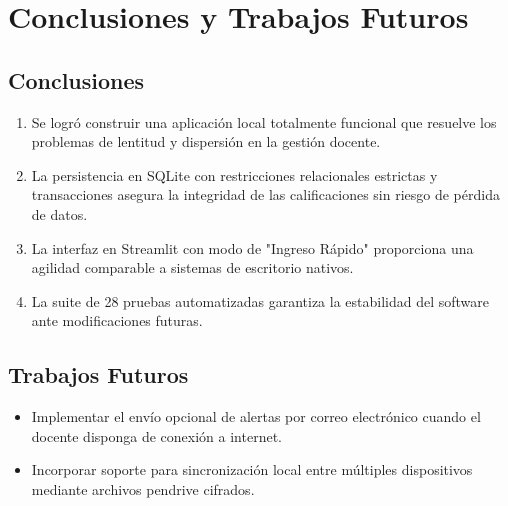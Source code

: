 \documentclass[12pt,a4paper]{article}
\begin{document}
\section{Conclusiones y Trabajos Futuros}

\subsection{Conclusiones}
\begin{enumerate}
    \item Se logró construir una aplicación local totalmente funcional que resuelve los problemas de lentitud y dispersión en la gestión docente.
    \item La persistencia en SQLite con restricciones relacionales estrictas y transacciones asegura la integridad de las calificaciones sin riesgo de pérdida de datos.
    \item La interfaz en Streamlit con modo de "Ingreso Rápido" proporciona una agilidad comparable a sistemas de escritorio nativos.
    \item La suite de 28 pruebas automatizadas garantiza la estabilidad del software ante modificaciones futuras.
\end{enumerate}

\subsection{Trabajos Futuros}
\begin{itemize}
    \item Implementar el envío opcional de alertas por correo electrónico cuando el docente disponga de conexión a internet.
    \item Incorporar soporte para sincronización local entre múltiples dispositivos mediante archivos pendrive cifrados.
\end{itemize}

\newpage


\end{document}
